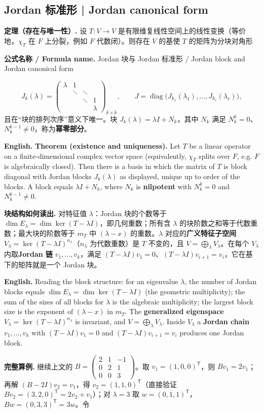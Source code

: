 \documentclass[UTF8,11pt,a4paper]{ctexart}
\newcommand{\EN}[1]{\par\noindent\textbf{English.} #1\par}
\newcommand{\FORMULA}[2]{\par\noindent\textbf{公式名称 / Formula name.} #1 / #2\par}
\begin{document}
\subsection{Jordan 标准形 | Jordan canonical form}
\noindent\textbf{定理（存在与唯一性）.} 设 $T:V\to V$ 是有限维复线性空间上的线性变换（等价地，$\chi_T$ 在 $F$ 上分裂，例如 $F$ 代数闭）。则存在 $V$ 的基使 $T$ 的矩阵为分块对角形
\FORMULA{Jordan 块与 Jordan 标准形}{Jordan block and Jordan canonical form}
\[
J_k(\lambda)=\begin{pmatrix}\lambda&1&&\\&\ddots&\ddots&\\&&\ddots&1\\&&&\lambda\end{pmatrix}_{k\times k},
\qquad
J=\operatorname{diag}\bigl(J_{k_1}(\lambda_1),\dots,J_{k_r}(\lambda_r)\bigr),
\]
且在“块的排列次序”意义下唯一。块 $J_k(\lambda)=\lambda I+N_k$，其中 $N_k$ 满足 $N_k^k=0$、$N_k^{k-1}\ne0$，称为\textbf{幂零部分}。
\EN{\textbf{Theorem (existence and uniqueness).} Let $T$ be a linear operator on a finite-dimensional complex vector space (equivalently, $\chi_T$ splits over $F$, e.g. $F$ is algebraically closed). Then there is a basis in which the matrix of $T$ is block diagonal with Jordan blocks $J_k(\lambda)$ as displayed, unique up to order of the blocks. A block equals $\lambda I+N_k$, where $N_k$ is \textbf{nilpotent} with $N_k^k=0$ and $N_k^{k-1}\ne0$.}
\noindent\textbf{块结构如何读出.} 对特征值 $\lambda$：Jordan 块的个数等于 $\dim E_\lambda=\dim\ker(T-\lambda I)$，即几何重数；所有含 $\lambda$ 的块阶数之和等于代数重数；最大块的阶数等于 $m_T$ 中 $(\lambda-x)$ 的重数。$\lambda$ 对应的\textbf{广义特征子空间} $V_\lambda=\ker(T-\lambda I)^{n_\lambda}$（$n_\lambda$ 为代数重数）是 $T$ 不变的，且 $V=\bigoplus_\lambda V_\lambda$。在每个 $V_\lambda$ 内取\textbf{Jordan 链} $v_1,\dots,v_k$，满足 $(T-\lambda I)v_1=0$、$(T-\lambda I)v_{i+1}=v_i$，它在基下的矩阵就是一个 Jordan 块。
\EN{Reading the block structure: for an eigenvalue $\lambda$, the number of Jordan blocks equals $\dim E_\lambda=\dim\ker(T-\lambda I)$ (the geometric multiplicity); the sum of the sizes of all blocks for $\lambda$ is the algebraic multiplicity; the largest block size is the exponent of $(\lambda-x)$ in $m_T$. The \textbf{generalized eigenspace} $V_\lambda=\ker(T-\lambda I)^{n_\lambda}$ is invariant, and $V=\bigoplus_\lambda V_\lambda$. Inside $V_\lambda$ a \textbf{Jordan chain} $v_1,\dots,v_k$ with $(T-\lambda I)v_1=0$ and $(T-\lambda I)v_{i+1}=v_i$ produces one Jordan block.}
\noindent\textbf{完整算例.} 继续上文的 $B=\begin{pmatrix}2&1&-1\\0&2&1\\0&0&3\end{pmatrix}$。取 $v_1=(1,0,0)^{\mathsf T}$，则 $Bv_1=2v_1$；再解 $(B-2I)v_2=v_1$，得 $v_2=(1,1,0)^{\mathsf T}$（直接验证 $Bv_2=(3,2,0)^{\mathsf T}=2v_2+v_1$）；对 $\lambda=3$ 取 $w=(0,1,1)^{\mathsf T}$，$Bw=(0,3,3)^{\mathsf T}=3w$。令
\end{document}

